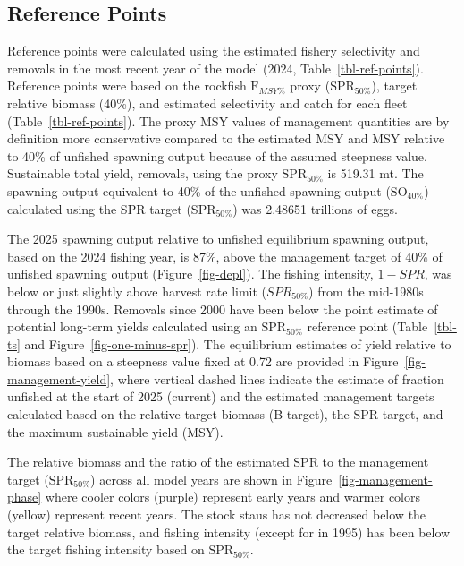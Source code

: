 \documentclass[
]{scrartcl}
\begin{document}
\subsection{Reference Points}\label{reference-points-1}

Reference points were calculated using the estimated fishery selectivity
and removals in the most recent year of the model (2024,
Table~\ref{tbl-ref-points}). Reference points were based on the rockfish
\(\text{F}_{MSY\%}\) proxy (\(\text{SPR}_{50\%}\)), target relative
biomass (40\%), and estimated selectivity and catch for each fleet
(Table~\ref{tbl-ref-points}). The proxy MSY values of management
quantities are by definition more conservative compared to the estimated
MSY and MSY relative to 40\% of unfished spawning output because of the
assumed steepness value. Sustainable total yield, removals, using the
proxy \(\text{SPR}_{50\%}\) is 519.31 mt. The spawning output equivalent
to 40\% of the unfished spawning output (\(\text{SO}_{40\%}\))
calculated using the SPR target (\(\text{SPR}_{50\%}\)) was 2.48651
trillions of eggs.

The 2025 spawning output relative to unfished equilibrium spawning
output, based on the 2024 fishing year, is 87\%, above the management
target of 40\% of unfished spawning output (Figure~\ref{fig-depl}). The
fishing intensity, \(1-SPR\), was below or just slightly above harvest
rate limit (\(SPR_{50\%}\)) from the mid-1980s through the 1990s.
Removals since 2000 have been below the point estimate of potential
long-term yields calculated using an \(\text{SPR}_{50\%}\) reference
point (Table~\ref{tbl-ts} and Figure~\ref{fig-one-minus-spr}). The
equilibrium estimates of yield relative to biomass based on a steepness
value fixed at 0.72 are provided in Figure~\ref{fig-management-yield},
where vertical dashed lines indicate the estimate of fraction unfished
at the start of 2025 (current) and the estimated management targets
calculated based on the relative target biomass (B target), the SPR
target, and the maximum sustainable yield (MSY).

The relative biomass and the ratio of the estimated SPR to the
management target (\(\text{SPR}_{50\%}\)) across all model years are
shown in Figure~\ref{fig-management-phase} where cooler colors (purple)
represent early years and warmer colors (yellow) represent recent years.
The stock staus has not decreased below the target relative biomass, and
fishing intensity (except for in 1995) has been below the target fishing
intensity based on \(\text{SPR}_{50\%}\).
\end{document}
